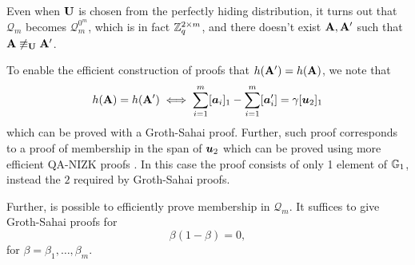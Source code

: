 Even 
when $\mathbf{{U}}$ is chosen from the perfectly hiding distribution, it turns out that $\mathcal{Q}_m$ becomes $\mathcal{Q}_m^{0^m}$, which is in fact $\mathbb{Z}_q^{2\times m}$, and there doesn't exist $\mathbf{{A}},\mathbf{{A}}'$ such that $\mathbf{{A}}\not\equiv_{\mathbf{{U}}}\mathbf{{A}}'$. 

To enable the efficient construction of proofs that $h(\mathbf{{A}}') = h(\mathbf{{A}})$, we note that
\begin{equation}
h(\mathbf{{A}})=h(\mathbf{{A}}') \iff \sum_{i=1}^{m}[{\boldsymbol{a}}_i]_1 - \sum_{i=1}^m[{\boldsymbol{a}}'_i] = \gamma[{\boldsymbol{u}}_2]_1
\end{equation}
which can be proved with a Groth-Sahai proof. Further, such proof corresponds to a proof of membership in the span of ${\boldsymbol{u}}_2$ which can be proved using more efficient QA-NIZK proofs \cite{C:JutRoy14,EC:KilWee15}. In this case the proof consists of only 1 element of $\mathbb{G}_1$, instead the $2$ required by Groth-Sahai proofs.

Further, is possible to efficiently prove membership in $\mathcal{Q}_m$. It suffices to give Groth-Sahai proofs for
\begin{equation}
\beta(1-\beta)=0 \label{eq:Qm-memb},
\end{equation}
for $\beta=\beta_1,\ldots,\beta_m$.

